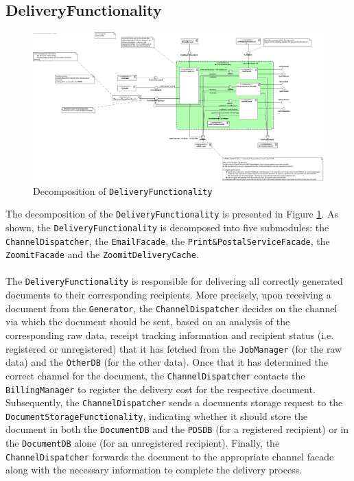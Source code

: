 \documentclass[a4paper,10pt]{article}
\begin{document}
\subsection{DeliveryFunctionality}\label{subsec:decomp-DeliveryFunctionality}
\begin{figure}[!htp]
	\centering
	\includegraphics[height=0.9\textheight]{DeliveryFunctionality.png}
	\caption{Decomposition of \texttt{DeliveryFunctionality}}
	\label{fig:decomp-DeliveryFunctionality}
\end{figure}
\FloatBarrier
\noindent
The decomposition of the \texttt{DeliveryFunctionality} is presented in Figure \ref{fig:decomp-DeliveryFunctionality}. As shown, the \texttt{DeliveryFunctionality} is decomposed into five submodules: the \texttt{ChannelDispatcher}, the \texttt{EmailFacade}, the \texttt{Print\&PostalServiceFacade}, the \texttt{ZoomitFacade} and the \texttt{ZoomitDeliveryCache}.\\\\
The \texttt{DeliveryFunctionality} is responsible for delivering all correctly generated documents to their corresponding recipients. More precisely, upon receiving a document from the \texttt{Generator}, the \texttt{ChannelDispatcher} decides on the channel via which the document should be sent, based on an analysis of the corresponding raw data, receipt tracking information and recipient status (i.e. registered or unregistered) that it has fetched from the \texttt{JobManager} (for the raw data) and the \texttt{OtherDB} (for the other data). Once that it has determined the correct channel for the document, the \texttt{ChannelDispatcher} contacts the \texttt{BillingManager} to register the delivery cost for the respective document. Subsequently, the \texttt{ChannelDispatcher} sends a documents storage request to the \texttt{DocumentStorageFunctionality}, indicating whether it should store the document in both the \texttt{DocumentDB} and the \texttt{PDSDB} (for a registered recipient) or in the \texttt{DocumentDB} alone (for an unregistered recipient). Finally, the \texttt{ChannelDispatcher} forwards the document to the appropriate channel facade along with the necessary information to complete the delivery process.\\\\
\end{document}
